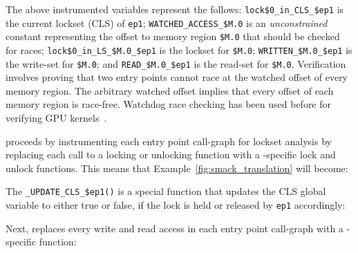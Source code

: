 The above instrumented variables represent the follows: \texttt{lock\$0\_in\_CLS\_\$ep1} is the current lockset (CLS) of \texttt{ep1}; \texttt{WATCHED\_ACCESS\_\$M.0} is an \emph{unconstrained} constant representing the offset to memory region \texttt{\$M.0} that should be checked for races; \texttt{lock\$0\_in\_LS\_\$M.0\_\$ep1} is the lockset for \texttt{\$M.0}; \texttt{WRITTEN\_\$M.0\_\$ep1} is the write-set for \texttt{\$M.0}; and \texttt{READ\_\$M.0\_\$ep1} is the read-set for \texttt{\$M.0}. Verification involves proving that two entry points cannot race at the watched offset of every memory region. The arbitrary watched offset implies that every offset of each memory region is race-free. Watchdog race checking has been used before for verifying GPU kernels~\cite{bardsley2014engineering}.

\whoop proceeds by instrumenting each entry point call-graph for lockset analysis by replacing each call to a locking or unlocking function with a \whoop-specific lock and unlock functions. This means that Example~\ref{fig:smack_translation} will become:


The \texttt{\_UPDATE\_CLS\_\$ep1()} is a special function that updates the CLS global variable to either true or false, if the lock is held or released by \texttt{ep1} accordingly:


Next, \whoop replaces every write and read access in each entry point call-graph with a \whoop-specific function:

